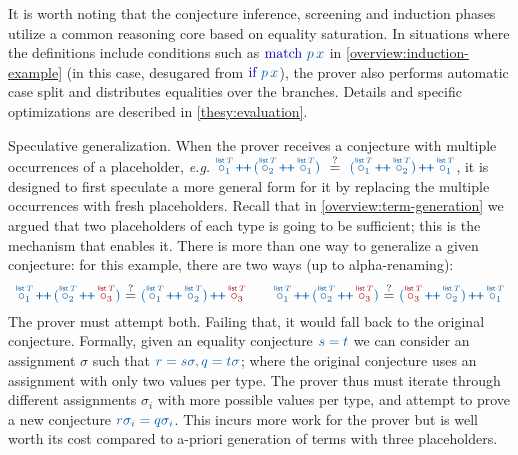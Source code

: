It is worth noting that the conjecture inference, screening and induction phases
utilize a common reasoning core based on equality saturation.
In situations where the definitions include conditions such as
$\clrterm\tmatch~p\,x$ in \autoref{overview:induction-example} (in this case, desugared from $\clrterm\tif~p\,x$), the prover also performs automatic case split
and distributes equalities over the branches.
Details and specific optimizations are described in \autoref{thesy:evaluation}.

\begin{paragraph}{Speculative generalization.}
When the prover receives a conjecture with multiple occurrences of a placeholder, \textit{e.g.}
${\clrterm {\pholder{1}{\tlist\,T}} \concat 
   {(\pholder{2}{\tlist\,T} \concat \pholder{1}{\tlist\,T})}}
~\maybeEq~
 {\clrterm {({{\pholder{1}{\tlist\,T}} \concat 
   {\pholder{2}{\tlist\,T}})} \concat \pholder{1}{\tlist\,T}}}$,
it is designed to first speculate a more general form for it by replacing the multiple occurrences with fresh placeholders.
Recall that in \autoref{overview:term-generation} we argued that two placeholders of each type is going to be sufficient;
this is the mechanism that enables it.
There is more than one way to generalize a given conjecture: for this example, there are two ways (up to alpha-renaming):
\[
{\clrterm {\pholder{1}{\tlist\,T}} \concat 
   {(\pholder{2}{\tlist\,T} \concat {\clrhi\pholder{3}{\tlist\,T}})}}
\maybeEq
 {\clrterm {({{\pholder{1}{\tlist\,T}} \concat 
   {\pholder{2}{\tlist\,T}})} \concat {\clrhi\pholder{3}{\tlist\,T}}}}
\hspace{2em}
{\clrterm {\pholder{1}{\tlist\,T}} \concat 
   {(\pholder{2}{\tlist\,T} \concat {\clrhi\pholder{3}{\tlist\,T}})}}
\maybeEq
 {\clrterm {({{\clrhi\pholder{3}{\tlist\,T}} \concat 
   {\pholder{2}{\tlist\,T}})} \concat \pholder{1}{\tlist\,T}}}
\]
The prover must attempt both. Failing that, it would fall back to the original conjecture.
Formally, given an equality conjecture $\clrterm{s = t}$ we can consider an assignment $\sigma$ such that $\clrterm{ r = s\sigma, q = t\sigma}$;
where the original conjecture uses an assignment with only two values per type.
The prover thus must iterate through different assignments $\sigma_i$ with more possible values per type, and attempt to prove a new conjecture $\clrterm{r\sigma_i = q\sigma_i}$.
This incurs more work for the prover but is well worth its cost compared to a-priori generation of terms with three placeholders. 
\end{paragraph}


